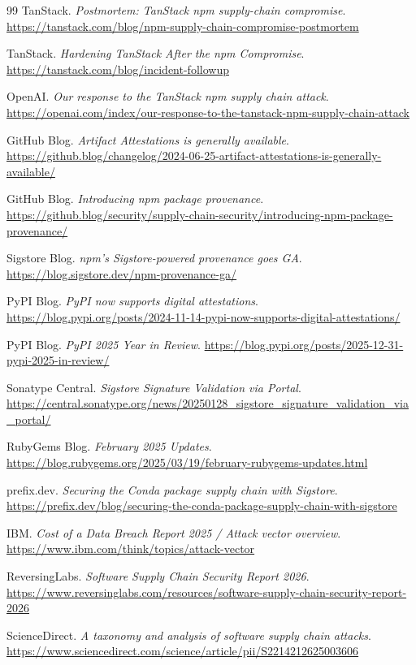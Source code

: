 \documentclass[12pt,a4paper]{article}
\begin{document}
\begin{thebibliography}{99}
TanStack.
\textit{Postmortem: TanStack npm supply-chain compromise}.
\url{https://tanstack.com/blog/npm-supply-chain-compromise-postmortem}

TanStack.
\textit{Hardening TanStack After the npm Compromise}.
\url{https://tanstack.com/blog/incident-followup}

OpenAI.
\textit{Our response to the TanStack npm supply chain attack}.
\url{https://openai.com/index/our-response-to-the-tanstack-npm-supply-chain-attack}

GitHub Blog.
\textit{Artifact Attestations is generally available}.
\url{https://github.blog/changelog/2024-06-25-artifact-attestations-is-generally-available/}

GitHub Blog.
\textit{Introducing npm package provenance}.
\url{https://github.blog/security/supply-chain-security/introducing-npm-package-provenance/}

Sigstore Blog.
\textit{npm's Sigstore-powered provenance goes GA}.
\url{https://blog.sigstore.dev/npm-provenance-ga/}

PyPI Blog.
\textit{PyPI now supports digital attestations}.
\url{https://blog.pypi.org/posts/2024-11-14-pypi-now-supports-digital-attestations/}

PyPI Blog.
\textit{PyPI 2025 Year in Review}.
\url{https://blog.pypi.org/posts/2025-12-31-pypi-2025-in-review/}

Sonatype Central.
\textit{Sigstore Signature Validation via Portal}.
\url{https://central.sonatype.org/news/20250128_sigstore_signature_validation_via_portal/}

RubyGems Blog.
\textit{February 2025 Updates}.
\url{https://blog.rubygems.org/2025/03/19/february-rubygems-updates.html}

prefix.dev.
\textit{Securing the Conda package supply chain with Sigstore}.
\url{https://prefix.dev/blog/securing-the-conda-package-supply-chain-with-sigstore}

IBM.
\textit{Cost of a Data Breach Report 2025 / Attack vector overview}.
\url{https://www.ibm.com/think/topics/attack-vector}

ReversingLabs.
\textit{Software Supply Chain Security Report 2026}.
\url{https://www.reversinglabs.com/resources/software-supply-chain-security-report-2026}


ScienceDirect.
\textit{A taxonomy and analysis of software supply chain attacks}.
\url{https://www.sciencedirect.com/science/article/pii/S2214212625003606}

\end{thebibliography}
\end{document}
